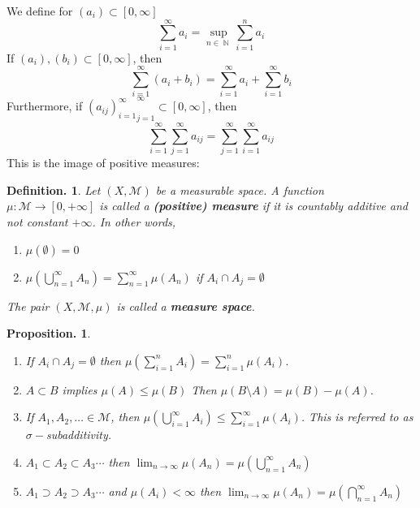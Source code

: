 \documentclass[11pt, a4paper]{memoir}
\DeclareMathOperator{\N}{{\mathbb{N}}}
\theoremstyle{change}
\newtheorem{proposition}[theorem]{Proposition.}
\theoremstyle{plain}
\theoremstyle{nonumberplain}
\newtheorem{definition}{Definition.}
\begin{document}
We define for $(a_i)\subset[0,\infty]$
\[\sum\limits_{i=1}^\infty a_i=\sup_{n\in\N}\sum\limits_{i=1}^n a_i\]
If $(a_i),(b_i)\subset[0,\infty]$, then
\[\sum\limits_{i=1}^\infty(a_i+b_i)=\sum\limits_{i=1}^\infty a_i+\sum\limits_{i=1}^\infty b_i\]
Furthermore, if ${(a_{ij})_{i=1}^\infty}_{j=1}^\infty\subset[0,\infty]$, then
\[\sum\limits_{i=1}^\infty\sum\limits_{j=1}^\infty a_{ij}=\sum\limits_{j=1}^\infty\sum\limits_{i=1}^\infty a_{ij}\]
This is the image of positive measures:
\begin{definition}
    Let $(X,\mathcal{M})$ be a measurable space.
    A function $\mu:\mathcal{M}\to[0,+\infty]$ is called a \textbf{(positive) measure} if it is countably additive and not constant $+\infty$.
    In other words,
    \begin{enumerate}[nolistsep]
        \item $\mu(\emptyset)=0$
        \item $\mu\left(\bigcup\limits_{n=1}^\infty A_n\right)=\sum\limits_{n=1}^\infty \mu(A_n)$ if $A_i\cap A_j=\emptyset$
    \end{enumerate}
    The pair $(X,\mathcal{M},\mu)$ is called a \textbf{measure space}.
\end{definition}
\begin{proposition}
    \begin{enumerate}[nolistsep]
        \item If $A_i\cap A_j=\emptyset$ then $\mu\left(\sum_{i=1}^n A_i\right)=\sum_{i=1}^n\mu(A_i)$.
        \item $A\subset B$ implies $\mu(A)\leq\mu(B)$
            Then $\mu(B\setminus A)=\mu(B)-\mu(A)$.
        \item If $A_1,A_2,\ldots\in\mathcal{M}$, then $\mu\left(\bigcup_{i=1}^\infty A_i\right)\leq\sum_{i=1}^\infty \mu(A_i)$.
            This is referred to as $\sigma-$subadditivity.
        \item $A_1\subset A_2\subset A_3\cdots$ then $\lim_{n\to\infty}\mu(A_n)=\mu\left(\bigcup_{n=1}^\infty A_n\right)$
        \item $A_1\supset A_2\supset A_3\cdots$ and $\mu(A_i)<\infty$ then $\lim_{n\to\infty}\mu(A_n)=\mu\left(\bigcap_{n=1}^\infty A_n\right)$
    \end{enumerate}
\end{proposition}
\end{document}
